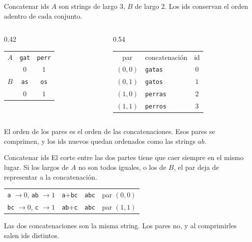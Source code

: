 \begin{frame}{Concatenar ids}
  \(A\) son strings de largo \(3\), \(B\) de largo \(2\).
  Los ids conservan el orden adentro de cada conjunto.

  \vspace{0.45em}
  \begin{columns}[c,onlytextwidth]
    \begin{column}{0.42\textwidth}
      \centering
      \begin{tabular}{@{}l@{\ \ }c@{\ \ }c@{}}
        \(A\) & \texttt{gat} & \texttt{perr} \\
            & \(0\) & \(1\) \\[0.45em]
        \(B\) & \texttt{as} & \texttt{os} \\
            & \(0\) & \(1\)
      \end{tabular}
    \end{column}
    \begin{column}{0.54\textwidth}
      \centering
      \renewcommand{\arraystretch}{1.15}
      \begin{tabular}{@{}c@{\quad}l@{\quad}c@{}}
        par & concatenación & id \\
        \((0,0)\) & \texttt{gatas} & \(0\) \\
        \((0,1)\) & \texttt{gatos} & \(1\) \\
        \((1,0)\) & \texttt{perras} & \(2\) \\
        \((1,1)\) & \texttt{perros} & \(3\)
      \end{tabular}
    \end{column}
  \end{columns}

  \vspace{0.55em}
  El orden de los pares es el orden de las concatenaciones.
  Esos pares se comprimen, y los ids nuevos quedan ordenados como las strings \(ab\).
\end{frame}

\begin{frame}{Concatenar ids}
  El corte entre las dos partes tiene que caer siempre en el mismo lugar.
  Si los largos de \(A\) no son todos iguales, o los de \(B\), el par deja de representar a la concatenación.

  \vspace{0.6em}
  \begin{center}
  \renewcommand{\arraystretch}{1.35}
  \begin{tabular}{@{}l@{\quad}c@{\quad}c@{\quad}l@{}}
    \texttt{a} \(\to 0\), \texttt{ab} \(\to 1\) &
      \texttt{a}+\texttt{bc} & \texttt{abc} & par \((0,0)\) \\
    \texttt{bc} \(\to 0\), \texttt{c} \(\to 1\) &
      \texttt{ab}+\texttt{c} & \texttt{abc} & par \((1,1)\)
  \end{tabular}
  \end{center}

  \vspace{0.45em}
  Las dos concatenaciones son la misma string.
  Los pares no, y al comprimirles salen ids distintos.
\end{frame}
